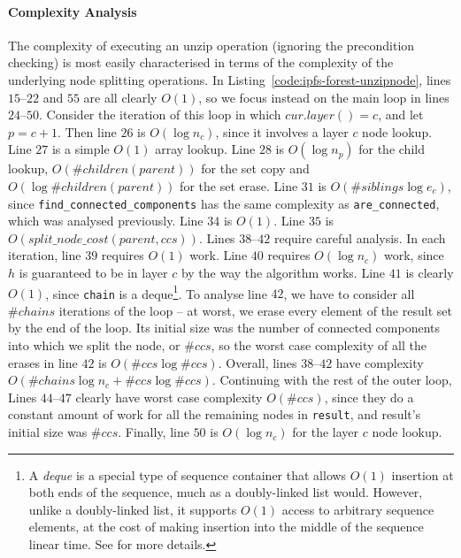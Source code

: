 \paragraph{Complexity Analysis}

\enlargethispage*{\baselineskip}

The complexity of executing an unzip operation (ignoring the precondition checking) is most easily characterised in terms of the complexity of the underlying node splitting operations. In Listing~\ref{code:ipfs-forest-unzipnode}, lines $15$--$22$ and $55$ are all clearly $O(1)$, so we focus instead on the main loop in lines $24$--$50$. Consider the iteration of this loop in which $cur.layer() = c$, and let $p = c+1$. Then line $26$ is $O(\log n_c)$, since it involves a layer $c$ node lookup. Line $27$ is a simple $O(1)$ array lookup. Line $28$ is $O(\log n_p)$ for the child lookup, $O(\#\mathit{children}(parent))$ for the set copy and $O(\log \#\mathit{children}(parent))$ for the set erase. Line $31$ is $O(\#\mathit{siblings} \log e_c)$, since \texttt{find_connected_components} has the same complexity as \texttt{are_connected}, which was analysed previously. Line $34$ is $O(1)$. Line $35$ is $O(\mathit{split\_node\_cost}(parent, ccs))$. Lines $38$--$42$ require careful analysis. In each iteration, line $39$ requires $O(1)$ work. Line $40$ requires $O(\log n_c)$ work, since $h$ is guaranteed to be in layer $c$ by the way the algorithm works. Line $41$ is clearly $O(1)$, since \texttt{chain} is a deque\footnote{A \emph{deque} is a special type of sequence container that allows $O(1)$ insertion at both ends of the sequence, much as a doubly-linked list would. However, unlike a doubly-linked list, it supports $O(1)$ access to arbitrary sequence elements, at the cost of making insertion into the middle of the sequence linear time. See \cite{stl} for more details.}. To analyse line $42$, we have to consider all $\#\mathit{chains}$ iterations of the loop -- at worst, we erase every element of the result set by the end of the loop. Its initial size was the number of connected components into which we split the node, or $\#\mathit{ccs}$, so the worst case complexity of all the erases in line $42$ is $O(\#\mathit{ccs} \log \#\mathit{ccs})$. Overall, lines $38$--$42$ have complexity $O(\#\mathit{chains} \log n_c + \#\mathit{ccs} \log \#\mathit{ccs})$. Continuing with the rest of the outer loop, Lines $44$--$47$ clearly have worst case complexity $O(\#\mathit{ccs})$, since they do a constant amount of work for all the remaining nodes in \texttt{result}, and result's initial size was $\#\mathit{ccs}$. Finally, line $50$ is $O(\log n_c)$ for the layer $c$ node lookup.

